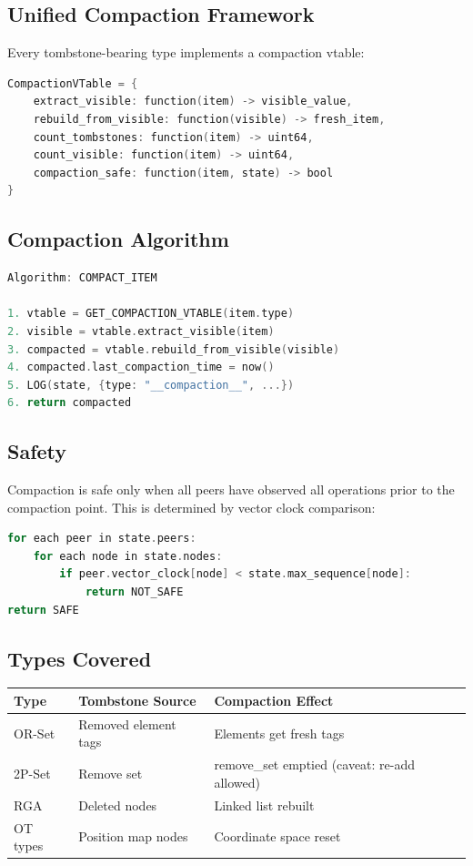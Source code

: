\documentclass[sigconf,nonacm]{acmart}
\begin{document}
\subsection{Unified Compaction Framework}

Every tombstone-bearing type implements a compaction vtable:

\begin{lstlisting}[language=C]
CompactionVTable = {
    extract_visible: function(item) -> visible_value,
    rebuild_from_visible: function(visible) -> fresh_item,
    count_tombstones: function(item) -> uint64,
    count_visible: function(item) -> uint64,
    compaction_safe: function(item, state) -> bool
}
\end{lstlisting}

\subsection{Compaction Algorithm}

\begin{lstlisting}[language=C]
Algorithm: COMPACT_ITEM

1. vtable = GET_COMPACTION_VTABLE(item.type)
2. visible = vtable.extract_visible(item)
3. compacted = vtable.rebuild_from_visible(visible)
4. compacted.last_compaction_time = now()
5. LOG(state, {type: "__compaction__", ...})
6. return compacted
\end{lstlisting}

\subsection{Safety}

Compaction is safe only when all peers have observed all operations prior to the compaction point. This is determined by vector clock comparison:

\begin{lstlisting}[language=C]
for each peer in state.peers:
    for each node in state.nodes:
        if peer.vector_clock[node] < state.max_sequence[node]:
            return NOT_SAFE
return SAFE
\end{lstlisting}

\subsection{Types Covered}

\vspace{4pt}
\begin{tabularx}{\columnwidth}{l>{\hsize=0.9\hsize}X>{\hsize=1.1\hsize}X}
\toprule
\textbf{Type} & \textbf{Tombstone Source} & \textbf{Compaction Effect} \\
\midrule
OR-Set & Removed element tags & Elements get fresh tags \\
2P-Set & Remove set & remove\_set emptied (caveat: re-add allowed) \\
RGA & Deleted nodes & Linked list rebuilt \\
OT types & Position map nodes & Coordinate space reset \\
\bottomrule
\end{tabularx}
\end{document}
